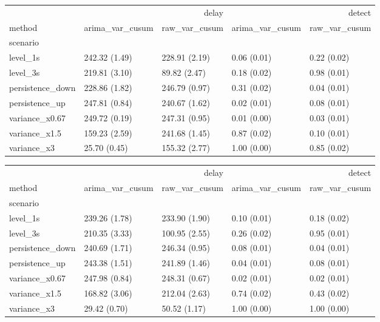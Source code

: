 \begin{tabular}{lllll}
\toprule
 & \multicolumn{2}{r}{delay} & \multicolumn{2}{r}{detect} \\
method & arima_var_cusum & raw_var_cusum & arima_var_cusum & raw_var_cusum \\
scenario &  &  &  &  \\
\midrule
level_1s & 242.32 (1.49) & 228.91 (2.19) & 0.06 (0.01) & 0.22 (0.02) \\
level_3s & 219.81 (3.10) & 89.82 (2.47) & 0.18 (0.02) & 0.98 (0.01) \\
persistence_down & 228.86 (1.82) & 246.79 (0.97) & 0.31 (0.02) & 0.04 (0.01) \\
persistence_up & 247.81 (0.84) & 240.67 (1.62) & 0.02 (0.01) & 0.08 (0.01) \\
variance_x0.67 & 249.72 (0.19) & 247.31 (0.95) & 0.01 (0.00) & 0.03 (0.01) \\
variance_x1.5 & 159.23 (2.59) & 241.68 (1.45) & 0.87 (0.02) & 0.10 (0.01) \\
variance_x3 & 25.70 (0.45) & 155.32 (2.77) & 1.00 (0.00) & 0.85 (0.02) \\
\bottomrule
\end{tabular}

\begin{tabular}{lllll}
\toprule
 & \multicolumn{2}{r}{delay} & \multicolumn{2}{r}{detect} \\
method & arima_var_cusum & raw_var_cusum & arima_var_cusum & raw_var_cusum \\
scenario &  &  &  &  \\
\midrule
level_1s & 239.26 (1.78) & 233.90 (1.90) & 0.10 (0.01) & 0.18 (0.02) \\
level_3s & 210.35 (3.33) & 100.95 (2.55) & 0.26 (0.02) & 0.95 (0.01) \\
persistence_down & 240.69 (1.71) & 246.34 (0.95) & 0.08 (0.01) & 0.04 (0.01) \\
persistence_up & 243.38 (1.51) & 241.89 (1.46) & 0.04 (0.01) & 0.08 (0.01) \\
variance_x0.67 & 247.98 (0.84) & 248.31 (0.67) & 0.02 (0.01) & 0.02 (0.01) \\
variance_x1.5 & 168.82 (3.06) & 212.04 (2.63) & 0.74 (0.02) & 0.43 (0.02) \\
variance_x3 & 29.42 (0.70) & 50.52 (1.17) & 1.00 (0.00) & 1.00 (0.00) \\
\bottomrule
\end{tabular}
